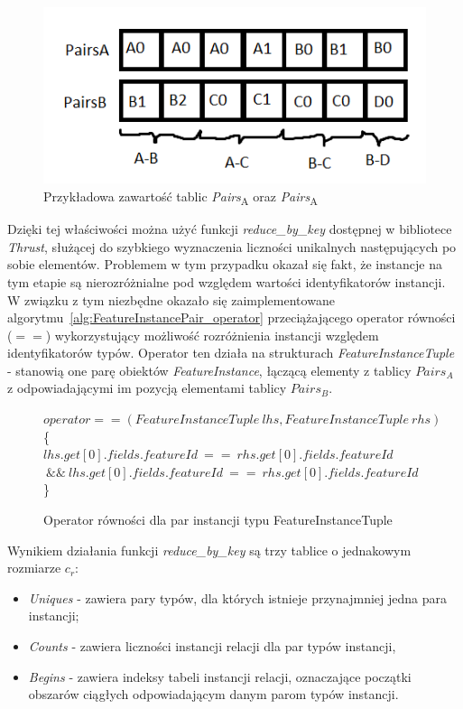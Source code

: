 \documentclass[12pt]{article}
\begin{document}
\begin{figure}[H]
\centering
\includegraphics{sortAttr_insTable}
\caption{Przykładowa zawartość tablic \textit{Pairs}\textsubscript{A} oraz \textit{Pairs}\textsubscript{A}}
\label{fig:pairs_content}
\end{figure}

Dzięki tej właściwości można użyć funkcji \textit{reduce\_by\_key} dostępnej w bibliotece \textit{Thrust}, służącej do szybkiego wyznaczenia liczności unikalnych następujących po sobie elementów. Problemem w tym przypadku okazał się fakt, że instancje na tym etapie są nierozróżnialne pod względem wartości identyfikatorów instancji. W związku z tym niezbędne okazało się zaimplementowane algorytmu~\ref{alg:FeatureInstancePair_operator} przeciążającego operator równości ($ == $) wykorzystujący możliwość rozróżnienia instancji względem identyfikatorów typów. Operator ten działa na strukturach \textit{FeatureInstanceTuple} - stanowią one parę obiektów \textit{FeatureInstance}, łączącą elementy z tablicy $ Pairs_{A} $ z odpowiadającymi im pozycją elementami tablicy $ Pairs_{B} $.

\begin{figure}[H]
\begin{algorithm}[H]
$operator==(FeatureInstanceTuple\ lhs,FeatureInstanceTuple\ rhs) $\\
\{\\
\Return $lhs.get[0].fields.featureId\ ==\ rhs.get[0].fields.featureId$\\
$\ \&\&\ lhs.get[0].fields.featureId\ ==\ rhs.get[0].fields.featureId$\\
\}
\caption{Operator równości dla par instancji typu FeatureInstanceTuple }
\label{alg:FeatureInstanceTuple_operator}
\end{algorithm}
\end{figure}

Wynikiem działania funkcji \textit{reduce\_by\_key} są trzy tablice o jednakowym rozmiarze $ c_{r} $:
\begin{itemize}
\item \textit{Uniques} - zawiera pary typów, dla których istnieje przynajmniej jedna para instancji;
\item \textit{Counts} - zawiera liczności instancji relacji dla par typów instancji,
\item \textit{Begins} - zawiera indeksy tabeli instancji relacji, oznaczające początki obszarów ciągłych odpowiadającym danym parom typów instancji.
\end{itemize}
\end{document}

